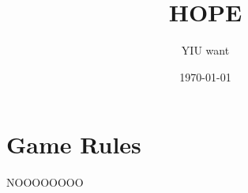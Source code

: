 \documentclass{article}%
\title{HOPE}%
\author{YIU want}%
\date{\today}%
\begin{document}
%
\normalsize%
\maketitle%
\section{Game Rules}%
\label{sec:GameRules}%
NOOOOOOOO

%
\end{document}
